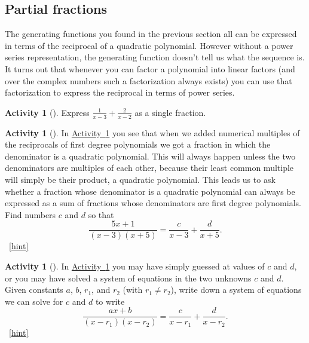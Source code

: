 \documentclass[10pt,]{book}
\theoremstyle{plain}
\theoremstyle{definition}
\theoremstyle{definition}
\theoremstyle{definition}
\newtheorem{activity}[project]{Activity}
\numberwithin{equation}{chapter}
\begin{document}
\subsection[{Partial fractions}]{Partial fractions}\label{subsection-27}
\hypertarget{p-938}{}%
The generating functions you found in the previous section all can be expressed in terms of the reciprocal of a quadratic polynomial. However without a power series representation, the generating function doesn't tell us what the sequence is. It turns out that whenever you can factor a polynomial into linear factors (and over the complex numbers such a factorization always exists) you can use that factorization to express the reciprocal in terms of power series.%
\begin{activity}[]\label{simplifysumoffractions}
\hypertarget{p-939}{}%
Express \(\frac{1}{x-3} + \frac{2}{x-2}\) as a single fraction.%
\end{activity}
\begin{activity}[]\label{partialfractionsintro}
\hypertarget{p-941}{}%
In \hyperref[simplifysumoffractions]{Activity~\ref{simplifysumoffractions}} you see that when we added numerical multiples of the reciprocals of first degree polynomials we got a fraction in which the denominator is a quadratic polynomial. This will always happen unless the two denominators are multiples of each other, because their least common multiple will simply be their product, a quadratic polynomial. This leads us to ask whether a fraction whose denominator is a quadratic polynomial can always be expressed as a sum of fractions whose denominators are first degree polynomials. Find numbers \(c\) and \(d\) so that%
\begin{equation*}
\frac{5x+1}{(x-3)(x+5)} = \frac{c}{x-3} + \frac{d}{x+5}.
\end{equation*}
%
~\hfill{\tiny\hyperlink{a-202}{[hint]}\hypertarget{q-202}{}}\end{activity}
\begin{activity}[]\label{partialfractions1}
\hypertarget{p-944}{}%
In \hyperref[partialfractionsintro]{Activity~\ref{partialfractionsintro}} you may have simply guessed at values of \(c\) and \(d\), or you may have solved a system of equations in the two unknowns \(c\) and \(d\). Given constants \(a\), \(b\), \(r_1\), and \(r_2\) (with \(r_1\not= r_2\)), write down a system of equations we can solve for \(c\) and \(d\) to write%
\begin{equation*}
\frac{ax+b}{(x-r_1)(x-r_2)} = \frac{c}{x-r_1} + \frac{d}{x-r_2}\text{.}
\end{equation*}
%
~\hfill{\tiny\hyperlink{a-203}{[hint]}\hypertarget{q-203}{}}\end{activity}
\end{document}

